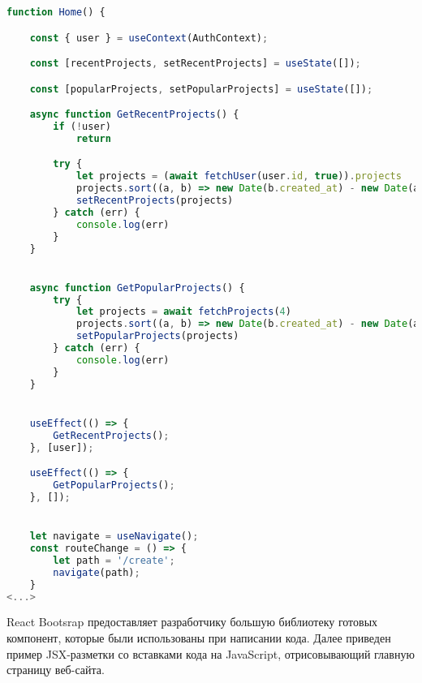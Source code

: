 \documentclass[a4paper,12pt]{article}
\begin{document}
\begin{lstlisting}[language=JavaScript, caption={Код на JavaScript, получающий необходимую информацию для отрисовки главной страницы.}]
function Home() {

    const { user } = useContext(AuthContext);

    const [recentProjects, setRecentProjects] = useState([]);

    const [popularProjects, setPopularProjects] = useState([]);

    async function GetRecentProjects() {
        if (!user)
            return

        try {
            let projects = (await fetchUser(user.id, true)).projects
            projects.sort((a, b) => new Date(b.created_at) - new Date(a.created_at))
            setRecentProjects(projects)
        } catch (err) {
            console.log(err)
        }
    }


    async function GetPopularProjects() {
        try {
            let projects = await fetchProjects(4)
            projects.sort((a, b) => new Date(b.created_at) - new Date(a.created_at))
            setPopularProjects(projects)
        } catch (err) {
            console.log(err)
        }
    }


    useEffect(() => {
        GetRecentProjects();
    }, [user]);

    useEffect(() => {
        GetPopularProjects();
    }, []);


    let navigate = useNavigate();
    const routeChange = () => {
        let path = '/create';
        navigate(path);
    }
<...>
\end{lstlisting}

React Bootsrap предоставляет разработчику большую библиотеку готовых компонент, которые были использованы при написании кода. Далее приведен пример JSX-разметки со вставками кода на JavaScript, отрисовывающий главную страницу веб-сайта.
\end{document}
